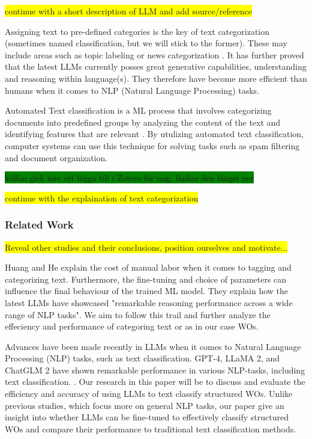\documentclass{article}
\begin{document}
\colorbox{yellow}{continue with a short description of LLM and add source/reference}

Assigning text to pre-defined categories is the key of text categorization
(sometimes named classification, but we will stick to the former).
These may include areas such as topic labeling or news categorization \cite{zhang2024}.
It has further proved that the latest LLMs currently posses great generative capabilities,
understanding and reasoning within language(s).
They therefore have become more efficient than humans when it comes to NLP (Natural Language Processing)
tasks.

Automated Text classification is a ML process that involves categorizing documents
into predefined groups by analyzing the content of the text and identifying features that are
relevant \cite{dalal2011}. By utulizing automated text classification, computer systems
can use this technique for solving tasks such as spam filtering and document organization.

\colorbox{green}{källan gick inte att lägga till i Zotero för mig, länkar den längst ner}

\colorbox{yellow}{continue with the explaination of text categorization}

\subsubsection{Related Work}

\colorbox{yellow}{Reveal other studies and their conclusions, position ourselves and motivate...}

Huang and He \cite{huang2024} explain the cost of manual labor when it comes to tagging and categorizing text.
Furthermore, the fine-tuning and choice of parameters can influence the final behaviour of the trained
ML model.
They explain how the latest LLMs have showcased "remarkable reasoning performance across a wide range of
NLP tasks".
We aim to follow this trail and further analyze the effeciency and performance of categoring text or as in our
case WOs.

Advances have been made recently in LLMs when it comes to Natural Language Processing (NLP)
tasks, such as text classification.
GPT-4, LLaMA 2, and ChatGLM 2 have shown remarkable performance in various NLP-tasks, including text classification.
\cite{zhang2024}.
Our research in this paper will be to discuss and evaluate the efficiency and accuracy of using LLMs
to text classify structured WOs. Unlike previous studies, which focus more on general NLP tasks,
our paper give an insight into whether LLMs can be fine-tuned to effectively classify structured WOs and
compare their performance to traditional text classification methods.
\end{document}
